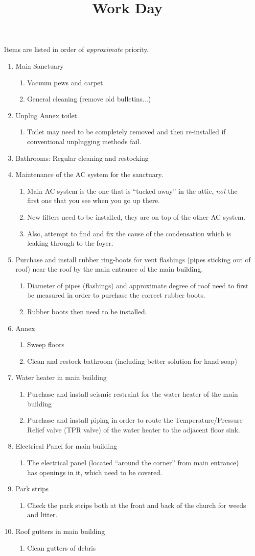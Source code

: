 \documentclass[12pt]{article}
\title{Work Day}
\newcommand{\BI}{\begin{enumerate}\item}
\newcommand{\I}{\item}
\newcommand{\EI}{\end{enumerate}}
\begin{document}
\maketitle
Items are listed in order of \emph{approximate} priority. 
\BI Main Sanctuary
    \BI Vacuum pews and carpet
    \I  General cleaning (remove old bulletins...) \EI
\I  Unplug Annex toilet.
    \BI Toilet may need to be completely removed 
        and then re-installed if conventional unplugging methods fail. \EI
\I  Bathrooms: Regular cleaning and restocking
\I  Maintenance of the AC system for the sanctuary.
    \BI Main AC system is the one that is ``tucked away'' in the attic,
        \emph{not} the first one that you see when you go up there.
    \I  New filters need to be installed, they are on top of the other AC system. 
    \I  Also, attempt to find and fix the cause of the condensation
        which is leaking through to the foyer. \EI
\I  Purchase and install rubber ring-boots for vent flashings 
    (pipes sticking out of roof) near the roof by the main entrance 
    of the main building.
    \BI Diameter of pipes (flashings) and approximate degree of roof 
        need to first be measured in order to purchase the correct rubber boots.
    \I  Rubber boots then need to be installed. \EI
\I  Annex
    \BI Sweep floors
    \I  Clean and restock bathroom (including better solution for hand soap) \EI
\I  Water heater in main building
    \BI Purchase and install seismic restraint for the water heater 
        of the main building
    \I  Purchase and install piping in order to route 
        the Temperature/Pressure Relief valve (TPR valve) of the water heater 
        to the adjacent floor sink. \EI
\I  Electrical Panel for main building
    \BI The electrical panel (located “around the corner” from main entrance) 
        has openings in it, which need to be covered. \EI
\I  Park strips
    \BI Check the park strips both at the front and back of the church 
        for weeds and litter. \EI
\I  Roof gutters in main building
    \BI Clean gutters of debris \EI
\EI
\end{document}
